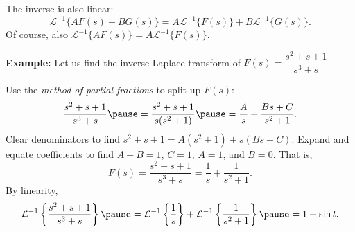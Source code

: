 \documentclass[10pt,aspectratio=169]{beamer}
\begin{document}
\begin{frame}
The inverse is also linear:
\begin{equation*}
{\mathcal{L}}^{-1} \bigl\{ A F(s) + B G(s) \bigr\} =
A {\mathcal{L}}^{-1} \bigl\{ F(s) \bigr\} +
B {\mathcal{L}}^{-1} \bigl\{ G(s) \bigr\} .
\end{equation*}
Of course, also
${\mathcal{L}}^{-1} \bigl\{ A F(s) \bigr\} =
A {\mathcal{L}}^{-1} \bigl\{ F(s) \bigr\}$.

\medskip
\pause

\textbf{Example:}
Let us find the inverse Laplace transform of
$F(s) = \dfrac{s^2+s+1}{s^3+s}$.

\medskip
\pause

Use the \emph{method of partial fractions} to split up $F(s)$:
\begin{equation*}
\frac{s^2+s+1}{s^3+s}
\pause
=
\frac{s^2+s+1}{s(s^2+1)}
\pause
=
\frac{A}{s} + 
\frac{Bs+C}{s^2+1} .
\end{equation*}
\pause
Clear denominators to find
$s^2+s+1 = A(s^2+1) + s(Bs+C)$.
\pause
Expand and equate coefficients to find
$A+B = 1$, $C=1$, $A=1$, and $B=0$.
\pause
That is,
\begin{equation*}
F(s) =
\frac{s^2+s+1}{s^3+s}
=
\frac{1}{s} +
\frac{1}{s^2+1} .
\end{equation*}
\pause
By linearity,
\begin{equation*}
{\mathcal{L}}^{-1} \left\{ 
\frac{s^2+s+1}{s^3+s} \right\}
\pause
=
{\mathcal{L}}^{-1} \left\{ 
\frac{1}{s} \right\} 
+
{\mathcal{L}}^{-1} \left\{ 
\frac{1}{s^2+1} \right\}
\pause
=
1 + 
\sin t .
\end{equation*}
\end{frame}
\end{document}
